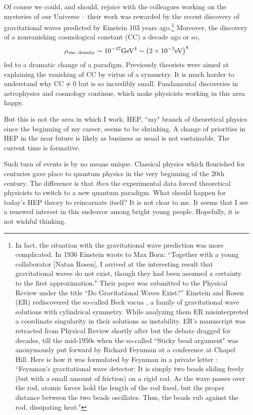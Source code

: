 \documentclass[epsfig,12pt]{article}
\newcommand{\beq}{\begin{equation}}
\newcommand{\eeq}{\end{equation}}
\begin{document}
Of course we could, and should, rejoice with the colleagues working on the mysteries of our Universe -- their work was rewarded by the recent discovery of gravitational waves  predicted by Einstein
103 years ago.\footnote{ In fact, the situation with the gravitational wave prediction was more complicated. In 1936 Einstein wrote to
 Max Born:
``Together with a young collaborator [Natan Rosen], I arrived at the interesting result that gravitational
waves do not exist, though they had been assumed a certainty to the first approximation."
Their paper was submitted  to the Physical Review
under the title ``Do Gravitational Waves Exist?'' Einstein and Rosen (ER)
rediscovered the so-called Beck vacua \cite{beck}, a family of gravitational wave solutions with cylindrical symmetry. While analyzing them
ER misinterpreted a coordinate singularity in their solutions as instability. ER's manuscript was retracted from Physical Review shortly after but the debate dragged for decades, till the mid-1950s when the so-called ``Sticky bead argument" was anonymously put forward by Richard Feynman at a conference at Chapel Hill. Here is how it was formulated by Feynman in a private letter \cite{RPF}: 	``Feynman's gravitational wave detector: It is simply two beads sliding freely (but with a small amount of friction) on a rigid rod. As the wave passes over the rod, atomic forces hold the length of the rod fixed, but the proper distance between the two beads oscillates. Thus, the beads rub against the rod, dissipating heat."} Moreover, the discovery of a nonvanishing cosmological  constant (CC) a decade ago or so,
\beq
\rho_{\rm vac.\, density} \sim 10^{-47} {\rm GeV}^4 \sim \big( 2\times 10^{-3} {\rm eV}\big)^4
\eeq
led to a dramatic change of  a paradigm. Previously theorists were aimed at explaining the vanishing of CC by virtue of a symmetry. It is much harder to understand why
 CC$\neq 0$ but is so incredibly small.
Fundamental discoveries in astrophysics and cosmology continue, which make physicists working in this area happy. 

But this is not the area in which I work. HEP, ``my" branch of theoretical physics since the beginning of my career, seems to be shrinking. A change of priorities in HEP in the near future is likely as business as usual is not sustainable. The current time is formative. 

Such turn of events is by no means unique. Classical physics which flourished for centuries gave place to quantum physics in the very beginning of the 20th century.
The difference is that {\em  then} the experimental data forced theoretical physicists to switch to a new quantum paradigm. What should happen for today's HEP theory to reincarnate itself?   It is not clear to me. It seems
that I see a renewed interest in this endeavor among bright young people. Hopefully, it is not wishful thinking. 
\end{document}
